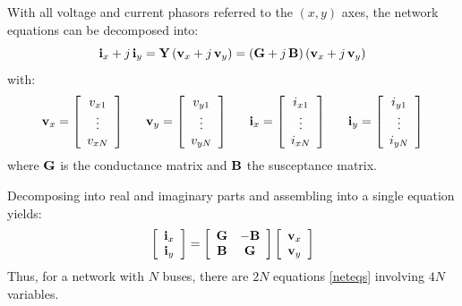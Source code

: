 With all voltage and current phasors referred to the $(x,y)$ axes, the network equations can be decomposed into:
\begin{equation}
{\bf i}_x + j \, {\bf i}_y = {\bf Y} \left( {\bf v}_x + j \, {\bf v}_y \right) = 
\left( {\bf G} + j \, {\bf B} \right) \left( {\bf v}_x + j \, {\bf v}_y \right)
\end{equation}
with:
\begin{equation}
{\bf v}_x = \left[ \begin{array}{c} v_{x1} \\ \vdots \\ v_{xN}
\end{array} \right] \;\;\;\;\;\; {\bf v}_y = \left[ \begin{array}{c} v_{y1} \\ \vdots \\ v_{yN} \end{array} \right] \;\;\;\;\;\; {\bf i}_x = \left[ \begin{array}{c} i_{x1} \\ \vdots \\ i_{xN} \end{array} \right] \;\;\;\;\;\; {\bf i}_y = \left[ \begin{array}{c} i_{y1} \\ \vdots \\ i_{yN}
\end{array}\right]
\end{equation}
where ${\bf G}$ is the conductance matrix and ${\bf B}$ the susceptance matrix.

Decomposing into real and imaginary parts and assembling into a single equation yields:
\begin{equation}\label{neteqs}
\left[ \begin{array}{c} {\bf i}_x \\ {\bf i}_y \end{array} \right] = \left[ \begin{array}{cc} {\bf G} & - {\bf B} \\ {\bf B} & {\bf G} \end{array} \right] \left[ \begin{array}{c} {\bf v}_x \\ {\bf v}_y \end{array} \right]
\end{equation}
Thus, for a network with $N$ buses, there are $2N$ equations \eqref{neteqs} involving $4N$ variables.

